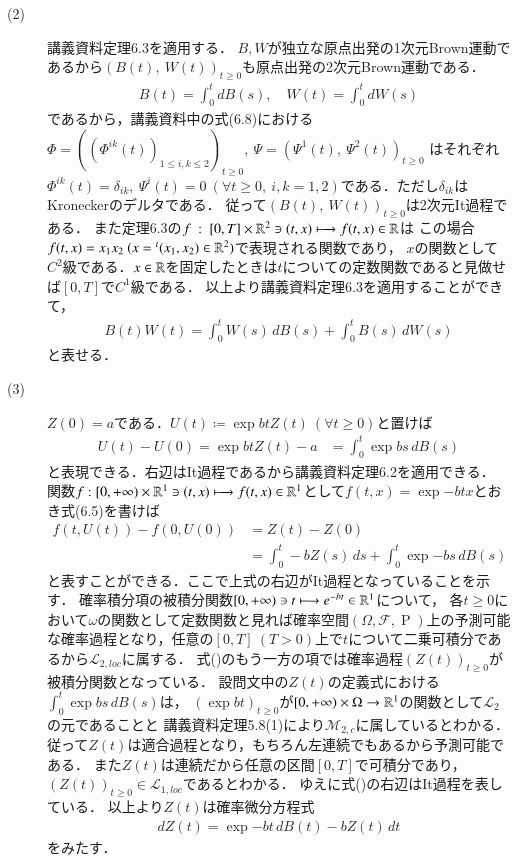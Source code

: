 \begin{description}
	\item[(2)] 講義資料定理6.3を適用する．
		$B,W$が独立な原点出発の1次元Brown運動であるから$(B(t),\ W(t))_{t \geq 0}$も原点出発の2次元Brown運動である．
		\begin{align}
			B(t) = \int_{0}^{t} dB(s), \quad W(t) = \int_{0}^{t} dW(s)
		\end{align}
		であるから，講義資料中の式(6.8)における$\Phi = ((\Phi^{ik}(t))_{1 \leq i, k \leq 2})_{t \geq 0},\ \Psi = (\Psi^1(t),\ \Psi^2(t))_{t \geq 0}$
		はそれぞれ$\Phi^{ik}(t) = \delta_{ik},\ \Psi^i(t) = 0\ (\forall t \geq 0,\ i,k=1,2)$である．ただし$\delta_{ik}$はKroneckerのデルタである．
		従って$(B(t),\ W(t))_{t \geq 0}$は2次元It過程である．
		また定理6.3の$f\ :\ [0, T] \times \mathbb{R}^2 \ni (t,x) \longmapsto f(t,x) \in \mathbb{R}$は
		この場合$f(t,x) = x_1 x_2\ (x = {}^t(x_1, x_2) \in \mathbb{R}^2)$で表現される関数であり，
		$x$の関数として$C^2$級である．$x \in \mathbb{R}$を固定したときは$t$についての定数関数であると見做せば$[0, T]$で$C^1$級である．
		以上より講義資料定理6.3を適用することができて，
		\begin{align}
			B(t)W(t) = \int_{0}^{t} W(s)\, dB(s) + \int_{0}^{t} B(s)\, dW(s)  
		\end{align}
		と表せる．
	
	\item[(3)] 
		$Z(0) = a$である．$U(t) \coloneqq \exp{bt}Z(t)\ (\forall t \geq 0)$と置けば
		\begin{align}
			U(t) - U(0) = \exp{bt}Z(t) - a &= \int_{0}^{t} \exp{bs}\, dB(s)
		\end{align}
		と表現できる．右辺はIt過程であるから講義資料定理6.2を適用できる．
		関数$f:[0,+\infty) \times \mathbb{R}^1 \ni (t,x) \longmapsto f(t,x) \in \mathbb{R}^1$として$f(t,x) = \exp{-bt}x$とおき式(6.5)を書けば
		\begin{align}
			f(t,U(t)) - f(0,U(0)) &= Z(t) - Z(0) \\
			&= \int_{0}^{t} -bZ(s)\, ds + \int_{0}^{t} \exp{-bs}\, dB(s)
			\label{eq:stoc_report_Q3_1}
		\end{align}
		と表すことができる．ここで上式の右辺がIt過程となっていることを示す．
		確率積分項の被積分関数$[0,+\infty) \ni t \longmapsto e^{-bt} \in \mathbb{R}^1$について，
		各$t \geq 0$において$\omega$の関数として定数関数と見れば確率空間$(\Omega, \mathcal{F}, \operatorname{P})$上の予測可能
		な確率過程となり，任意の$[0,T]\ (T>0)$上で$t$について二乗可積分であるから$\mathcal{L}_{2,loc}$に属する．
		式()のもう一方の項では確率過程$(Z(t))_{t \geq 0}$が被積分関数となっている．
		設問文中の$Z(t)$の定義式における$\int_{0}^{t} \exp{bs}\, dB(s)$は，
		$(\exp{bt})_{t \geq 0}$が$[0, +\infty) \times \Omega \rightarrow \mathbb{R}^1$の関数として$\mathcal{L}_2$の元であることと
		講義資料定理5.8(1)により$\mathcal{M}_{2,c}$に属しているとわかる．従って$Z(t)$は適合過程となり，もちろん左連続でもあるから予測可能である．
		また$Z(t)$は連続だから任意の区間$[0,T]$で可積分であり，$(Z(t))_{t \geq 0} \in \mathcal{L}_{1,loc}$であるとわかる．
		ゆえに式()の右辺はIt過程を表している．
		以上より$Z(t)$は確率微分方程式
		\begin{align}
			dZ(t) = \exp{-bt}\, dB(t) - bZ(t)\, dt
		\end{align}
		をみたす．
		\QED
\end{description}